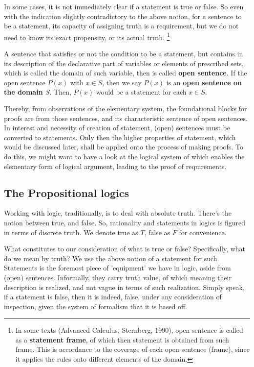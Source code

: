 In some cases, it is not immediately clear if a statement is true or false. So even with the indication slightly contradictory to the above notion, for a sentence to be a statement, its capacity of assigning truth is a requirement, but we do not need to know its exact propensity, or its actual truth.   
\footnote{In some texts (Advanced Calculus, Sternberg, 1990), open sentence is called as a \textbf{statement frame}, of which then statement is obtained from such frame. This is accordance to the coverage of each open sentence (frame), since it applies the rules onto different elements of the domain.}

A sentence that satisfies or not the condition to be a statement, but contains in its description of the declarative part of variables or elements of prescribed sets, which is called the domain of such variable, then is called \textbf{open sentence}. If the  open sentence $P(x)$ with \(x \in S\), then we say \(P(x)\) is an \textbf{open sentence on the domain $S$}. Then, $P(x)$ would be a statement for each $x\in S$. 

Thereby, from observations of the elementary system, the foundational blocks for proofs are from those sentences, and its characteristic sentence of open sentences. In interest and necessity of creation of statement, (open) sentences must be converted to statements. Only then the higher properties of statement, which would be discussed later, shall be applied onto the process of making proofs. To do this, we might want to have a look at the logical system of which enables the elementary form of logical argument, leading to the proof of requirements. 

\subsection{The Propositional logics}

Working with logic, traditionally, is to deal with absolute truth. There's the notion between true, and false. So, rationality and statements in logics is figured in terms of discrete truth. We denote true as $T$, false as $F$ for convenience. 

What constitutes to our consideration of what is true or false? Specifically, what do we mean by truth? We use the above notion of a statement for such. Statements is the foremost piece of 'equipment' we have in logic, aside from (open) sentences. Informally, they carry truth value, of which meaning their description is realized, and not vague in terms of such realization. Simply speak, if a statement is false, then it is indeed, false, under any consideration of inspection, given the system of formalism that it is based off. 


